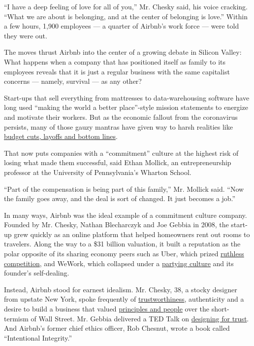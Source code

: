 ``I have a deep feeling of love for all of you,'' Mr. Chesky said, his
voice cracking. ``What we are about is belonging, and at the center of
belonging is love.'' Within a few hours, 1,900 employees --- a quarter
of Airbnb's work force --- were told they were out.

The moves thrust Airbnb into the center of a growing debate in Silicon
Valley: What happens when a company that has positioned itself as family
to its employees reveals that it is just a regular business with the
same capitalist concerns --- namely, survival --- as any other?

Start-ups that sell everything from mattresses to data-warehousing
software have long used ``making the world a better place''-style
mission statements to energize and motivate their workers. But as the
economic fallout from the coronavirus persists, many of those gauzy
mantras have given way to harsh realities like
\href{https://www.nytimes3xbfgragh.onion/2020/04/01/technology/virus-start-ups-pummeled-layoffs-unwinding.html}{budget
cuts, layoffs and bottom lines}.

That now puts companies with a ``commitment'' culture at the highest
risk of losing what made them successful, said Ethan Mollick, an
entrepreneurship professor at the University of Pennsylvania's Wharton
School.

``Part of the compensation is being part of this family,'' Mr. Mollick
said. ``Now the family goes away, and the deal is sort of changed. It
just becomes a job.''

In many ways, Airbnb was the ideal example of a commitment culture
company. Founded by Mr. Chesky, Nathan Blecharczyk and Joe Gebbia in
2008, the start-up grew quickly as an online platform that helped
homeowners rent out rooms to travelers. Along the way to a \$31 billion
valuation, it built a reputation as the polar opposite of its sharing
economy peers such as Uber, which prized
\href{https://www.nytimes3xbfgragh.onion/2017/02/22/technology/uber-workplace-culture.html}{ruthless
competition}, and WeWork, which collapsed under a
\href{https://www.nytimes3xbfgragh.onion/2019/11/02/business/adam-neumann-wework-exit-package.html}{partying
culture} and its founder's self-dealing.

Instead, Airbnb stood for earnest idealism. Mr. Chesky, 38, a stocky
designer from upstate New York, spoke frequently of
\href{https://news.airbnb.com/in-the-business-of-trust/}{trustworthiness},
authenticity and a desire to build a business that valued
\href{https://news.airbnb.com/serving-all-stakeholders/}{principles and
people} over the short-termism of Wall Street. Mr. Gebbia delivered a
TED Talk on
\href{https://www.ted.com/talks/joe_gebbia_how_airbnb_designs_for_trust?language=en}{designing
for trust}. And Airbnb's former chief ethics officer, Rob Chesnut, wrote
a book called ``Intentional Integrity.''

